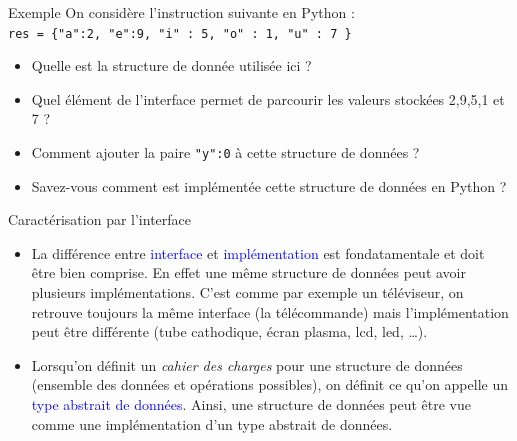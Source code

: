 \documentclass[10pt]{beamer}
\begin{document}
\begin{frame}{\Ctitle}{\stitle}
	\begin{exampleblock}{Exemple}
		On considère l'instruction suivante en Python : \\
		{\tt res = \{"a":2, "e":9, "i" : 5, "o" : 1, "u" : 7 \}}
		\begin{itemize}
			\item<1-> Quelle est la structure de donnée utilisée ici ?
			\item<2-> Quel élément de l'interface permet de parcourir les valeurs stockées 2,9,5,1 et 7 ?
			\item<3-> Comment ajouter la paire {\tt "y":0} à cette structure de données ?
			\item<4-> Savez-vous comment est implémentée cette structure de données en Python ?
		\end{itemize}
	\end{exampleblock}
\end{frame}

\begin{frame}{\Ctitle}{\stitle}
	\begin{alertblock}{Caractérisation par l'interface}
		\begin{itemize}
			\item<1-> La différence entre \textcolor{blue}{interface} et \textcolor{blue}{implémentation} est fondatamentale et doit être bien comprise. En effet une même structure de données peut avoir plusieurs implémentations. C'est comme par exemple un téléviseur, on retrouve toujours la même interface (la télécommande) mais l'implémentation peut être différente (tube cathodique, écran plasma, lcd, led, \dots).
			\item<2-> Lorsqu'on définit un \textit{cahier des charges} pour une structure de données (ensemble des données et opérations possibles), on définit ce qu'on appelle un \textcolor{blue}{type abstrait de données}.  Ainsi, une structure de données peut être vue comme une implémentation d'un type abstrait de données.
		\end{itemize}
	\end{alertblock}
\end{frame}
\end{document}
